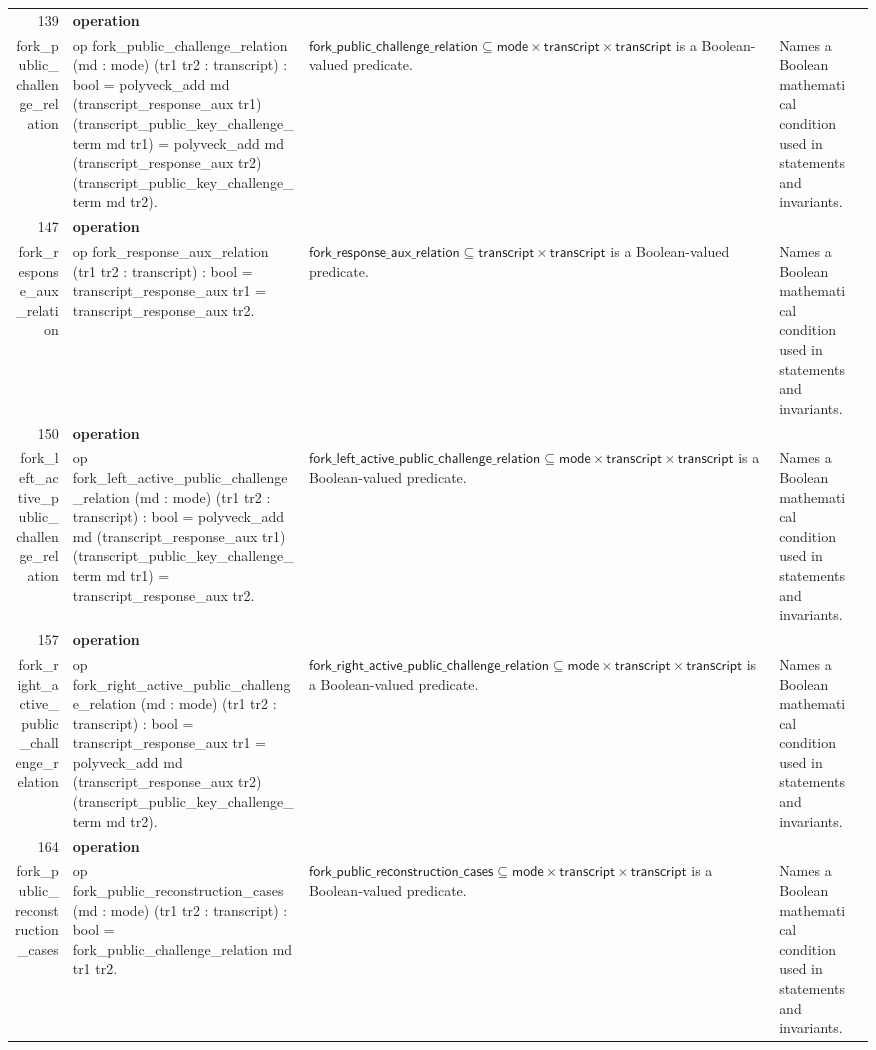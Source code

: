 \documentclass[10pt]{article}
\newcommand{\ec}[1]{\begingroup\ttfamily\scriptsize #1\endgroup}
\begin{document}
\begin{longtable}{r L{0.17\textwidth} L{0.26\textwidth} L{0.27\textwidth} L{0.20\textwidth}}
139 & \textbf{operation}\\\ec{fork\_public\_challenge\_relation} & \ec{op fork\_public\_challenge\_relation (md : mode) (tr1 tr2 : transcript) : bool = polyveck\_add md (transcript\_response\_aux tr1) (transcript\_public\_key\_challenge\_term md tr1) = polyveck\_add md (transcript\_response\_aux tr2) (transcript\_public\_key\_challenge\_term md tr2).} & \(\mathsf{fork\_public\_challenge\_relation} \subseteq \mathsf{mode} \times \mathsf{transcript} \times \mathsf{transcript}\) is a Boolean-valued predicate. & Names a Boolean mathematical condition used in statements and invariants. \\
147 & \textbf{operation}\\\ec{fork\_response\_aux\_relation} & \ec{op fork\_response\_aux\_relation (tr1 tr2 : transcript) : bool = transcript\_response\_aux tr1 = transcript\_response\_aux tr2.} & \(\mathsf{fork\_response\_aux\_relation} \subseteq \mathsf{transcript} \times \mathsf{transcript}\) is a Boolean-valued predicate. & Names a Boolean mathematical condition used in statements and invariants. \\
150 & \textbf{operation}\\\ec{fork\_left\_active\_public\_challenge\_relation} & \ec{op fork\_left\_active\_public\_challenge\_relation (md : mode) (tr1 tr2 : transcript) : bool = polyveck\_add md (transcript\_response\_aux tr1) (transcript\_public\_key\_challenge\_term md tr1) = transcript\_response\_aux tr2.} & \(\mathsf{fork\_left\_active\_public\_challenge\_relation} \subseteq \mathsf{mode} \times \mathsf{transcript} \times \mathsf{transcript}\) is a Boolean-valued predicate. & Names a Boolean mathematical condition used in statements and invariants. \\
157 & \textbf{operation}\\\ec{fork\_right\_active\_public\_challenge\_relation} & \ec{op fork\_right\_active\_public\_challenge\_relation (md : mode) (tr1 tr2 : transcript) : bool = transcript\_response\_aux tr1 = polyveck\_add md (transcript\_response\_aux tr2) (transcript\_public\_key\_challenge\_term md tr2).} & \(\mathsf{fork\_right\_active\_public\_challenge\_relation} \subseteq \mathsf{mode} \times \mathsf{transcript} \times \mathsf{transcript}\) is a Boolean-valued predicate. & Names a Boolean mathematical condition used in statements and invariants. \\
164 & \textbf{operation}\\\ec{fork\_public\_reconstruction\_cases} & \ec{op fork\_public\_reconstruction\_cases (md : mode) (tr1 tr2 : transcript) : bool = fork\_public\_challenge\_relation md tr1 tr2.} & \(\mathsf{fork\_public\_reconstruction\_cases} \subseteq \mathsf{mode} \times \mathsf{transcript} \times \mathsf{transcript}\) is a Boolean-valued predicate. & Names a Boolean mathematical condition used in statements and invariants. \\

\end{longtable}
\end{document}
